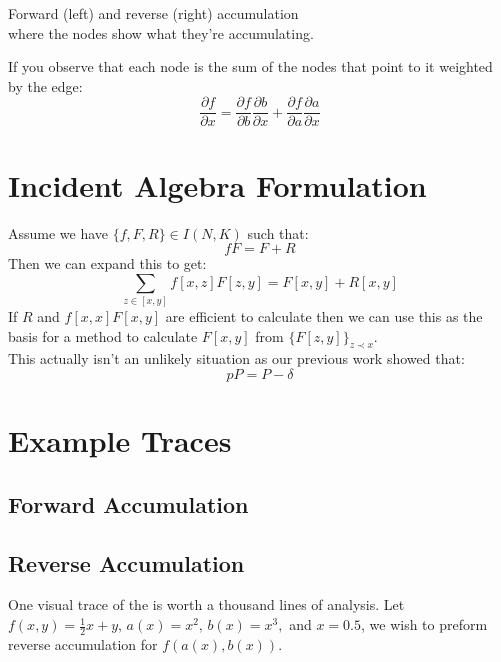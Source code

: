 \begin{center}
\quad
{}

	Forward (left) and reverse (right) accumulation\\
	where the nodes show what they're accumulating.
\end{center}
If you observe that each node is the sum of the nodes that point to it weighted by the edge:
\[\frac{\partial f}{\partial x} = \frac{\partial f}{\partial b}\frac{\partial b}{\partial x}+\frac{\partial f}{\partial a}\frac{\partial a}{\partial x}\]

\section{Incident Algebra Formulation}
Assume we have $\{f,F,R\}\in I(N,K)$ such that:
\[fF = F+R\]
Then we can expand this to get:
\[\sum_{z\in[x,y]}f[x,z]F[z,y] = F[x,y]+R[x,y]\]
If $R$ and $f[x,x]F[x,y]$ are efficient to calculate then we can use this as the basis for a method to calculate $F[x,y]$ from $\{F[z,y]\}_{z\prec x}$.
\\

This actually isn't an unlikely situation as our previous work showed that:
\[pP=P-\delta\]

\section{Example Traces}
\subsection{Forward Accumulation}
\subsection{Reverse Accumulation}
One visual trace of the is worth a thousand lines of analysis.
Let $f(x,y) = \frac{1}{2}x+y,\,a(x)=x^2,\,b(x)=x^3,$ and $x=0.5$, 
we wish to preform reverse accumulation for $f(a(x),b(x))$.

